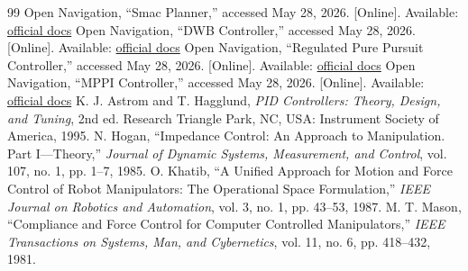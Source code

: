 \begin{thebibliography}{99}
 Open Navigation, ``Smac Planner,'' accessed May 28, 2026. [Online]. Available: \href{https://docs.nav2.org/configuration/packages/configuring-smac-planner.html}{official docs}
 Open Navigation, ``DWB Controller,'' accessed May 28, 2026. [Online]. Available: \href{https://docs.nav2.org/configuration/packages/configuring-dwb-controller.html}{official docs}
 Open Navigation, ``Regulated Pure Pursuit Controller,'' accessed May 28, 2026. [Online]. Available: \href{https://docs.nav2.org/configuration/packages/configuring-regulated-pp.html}{official docs}
 Open Navigation, ``MPPI Controller,'' accessed May 28, 2026. [Online]. Available: \href{https://docs.nav2.org/configuration/packages/configuring-mppic.html}{official docs}
 K. J. Astrom and T. Hagglund, \emph{PID Controllers: Theory, Design, and Tuning}, 2nd ed. Research Triangle Park, NC, USA: Instrument Society of America, 1995.
 N. Hogan, ``Impedance Control: An Approach to Manipulation. Part I---Theory,'' \emph{Journal of Dynamic Systems, Measurement, and Control}, vol. 107, no. 1, pp. 1--7, 1985.
 O. Khatib, ``A Unified Approach for Motion and Force Control of Robot Manipulators: The Operational Space Formulation,'' \emph{IEEE Journal on Robotics and Automation}, vol. 3, no. 1, pp. 43--53, 1987.
 M. T. Mason, ``Compliance and Force Control for Computer Controlled Manipulators,'' \emph{IEEE Transactions on Systems, Man, and Cybernetics}, vol. 11, no. 6, pp. 418--432, 1981.
\end{thebibliography}
